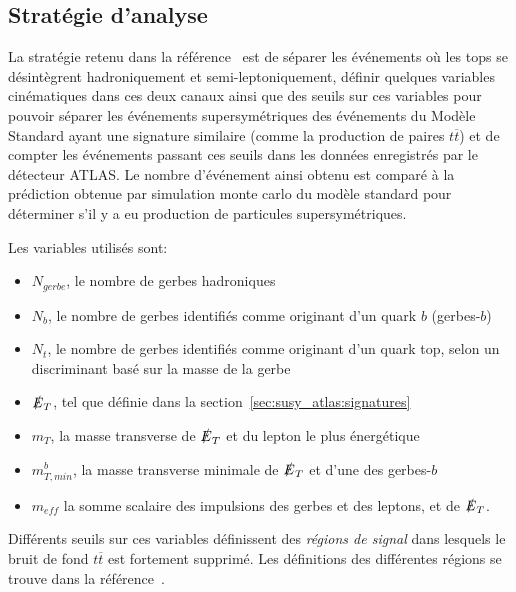\subsection{Stratégie d'analyse}
\label{sec:susy_atlas:gtt:strategie}

La stratégie retenu dans la référence~\cite{ATLAS-CONF-2015-067} est
de séparer les événements où les tops se désintègrent hadroniquement et
semi-leptoniquement, définir quelques variables cinématiques dans ces
deux canaux ainsi que des seuils sur ces variables pour pouvoir
séparer les événements supersymétriques des événements du Modèle
Standard ayant une signature similaire (comme la production de paires
$t\overline{t}$) et de compter les événements passant ces seuils dans
les données enregistrés par le détecteur ATLAS. Le nombre d'événement
ainsi obtenu est comparé à la prédiction obtenue par simulation monte carlo du modèle
standard pour déterminer s'il y a eu production de particules supersymétriques.

\noindent Les variables utilisés sont:

\begin{itemize}
\item $N_{gerbe}$, le nombre de gerbes hadroniques %
\item $N_b$, le nombre de gerbes identifiés comme originant d'un quark $b$ (gerbes-$b$)
\item $N_{t}$, le nombre de gerbes identifiés comme originant d'un
  quark top, selon un discriminant basé sur la masse de la gerbe
\item $\slashed{E}_T$, tel que définie dans la
  section~\ref{sec:susy_atlas:signatures}
\item $m_T$, la masse transverse de $\slashed{E}_T$ et du lepton le
  plus énergétique
\item $m_{T,min}^b$, la masse transverse minimale de $\slashed{E}_T$ et
  d'une des gerbes-$b$
\item $m_{eff}$ la somme scalaire des impulsions des gerbes et des leptons, et de $\slashed{E}_T$.
\end{itemize}

Différents seuils sur ces variables définissent des \emph{régions de
  signal} dans lesquels le bruit de fond $t\overline{t}$ est fortement
supprimé. Les définitions des différentes régions se trouve dans la
référence~\cite{ATLAS-CONF-2015-067}.


